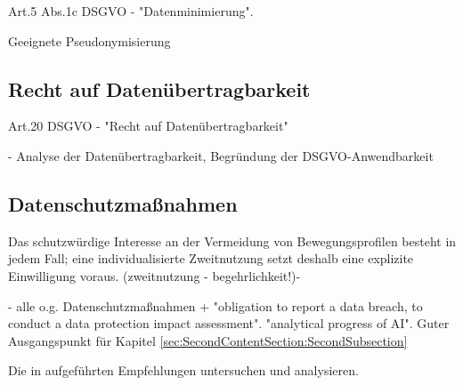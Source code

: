Art.5 Abs.1c DSGVO - "Datenminimierung". 

Geeignete Pseudonymisierung

\subsection{Recht auf Datenübertragbarkeit}

Art.20 DSGVO - "Recht auf Datenübertragbarkeit"

\cite{Straub2018} - Analyse der Datenübertragbarkeit, Begründung der DSGVO-Anwendbarkeit

\subsection{Datenschutzmaßnahmen}
Das schutzwürdige Interesse an der Vermeidung von Bewegungsprofilen besteht in jedem Fall; eine individualisierte Zweitnutzung setzt deshalb eine explizite Einwilligung voraus. (zweitnutzung - begehrlichkeit!)- \cite{Weichert2016}

\cite{Seewald2018} - alle o.g. Datenschutzmaßnahmen + "obligation to report a data breach, to conduct a data protection impact assessment". "analytical progress of AI". Guter Ausgangspunkt für Kapitel \ref{sec:SecondContentSection:SecondSubsection}

Die in \cite{Kiometzis2017} aufgeführten Empfehlungen untersuchen und analysieren. 

